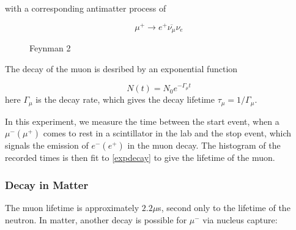 with a corresponding antimatter process of

\begin{equation}\mu^+ \rightarrow e^+ \overline{\nu_{\mu}}{\nu_e}\label{antimudecay}\end{equation}


\begin{center}
\begin{figure}[h]
\caption{Feynman 2}
\label{figure:feyn2}
\end{figure}
\end{center}


The decay of the muon is desribed by an exponential function

\begin{equation} N(t) = N_0 e^{-\Gamma_{\mu} t} \label{expdecay}\end{equation} 
here $\Gamma_{\mu}$ is the decay rate, which gives the decay lifetime
$\tau_{\mu} = 1/\Gamma_{\mu}$.

In this experiment, we measure the time between the start event, when
a $\mu^- (\mu^+)$ comes to rest in a scintillator in the lab and the
stop event, which signals the emission of $e^- (e^+)$ in the muon
decay. The histogram of the recorded times is then fit to
\eqref{expdecay} to give the lifetime of the muon.

\subsubsection{Decay in Matter}

The muon lifetime is approximately $2.2 \mu$s\cite{easwar}, second
only to the lifetime of the neutron. In matter, another decay is
possible for $\mu^-$ via nucleus capture:

